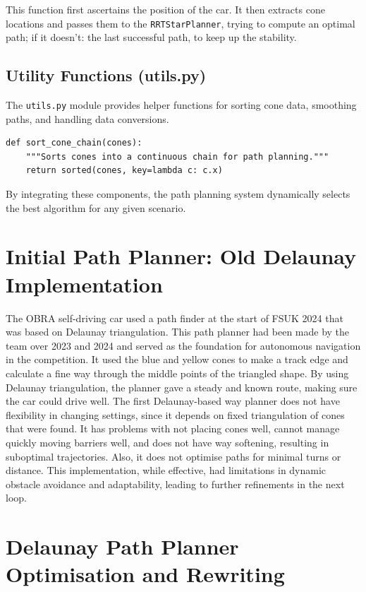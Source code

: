 \documentclass[a4paper,11pt]{report}
\begin{document}
This function first ascertains the position of the car.
It then extracts cone locations and passes them to the \texttt{RRTStarPlanner},
trying to compute an optimal path; if it doesn’t: the last successful path, to keep up the stability.

\subsection{Utility Functions (utils.py)}
The \texttt{utils.py} module provides helper functions for sorting cone data, smoothing paths, and handling data conversions.

\begin{verbatim}
def sort_cone_chain(cones):
    """Sorts cones into a continuous chain for path planning."""
    return sorted(cones, key=lambda c: c.x)
\end{verbatim}

By integrating these components, the path planning system dynamically selects the best 
algorithm for any given scenario.

\section{Initial Path Planner: Old Delaunay Implementation}

The OBRA self-driving car used a path finder at the start of FSUK 2024 that was based on Delaunay triangulation. 
This path planner had been made by the team over 2023 and 2024 and served as the foundation for autonomous navigation in the competition.
It used the blue and yellow cones to make a track edge and calculate a fine way through the middle points of the triangled shape. 
By using Delaunay triangulation, the planner gave a steady and known route, making sure the car could drive well. 
The first Delaunay-based way planner does not have flexibility in changing settings, since it depends on fixed triangulation of cones that were found. 
It has problems with not placing cones well, cannot manage quickly moving barriers well, and does not have way softening, resulting in suboptimal trajectories. 
Also, it does not optimise paths for minimal turns or distance. This implementation, while effective, had limitations in dynamic obstacle avoidance and adaptability, 
leading to further refinements in the next loop.

\section{Delaunay Path Planner Optimisation and Rewriting}
\end{document}
